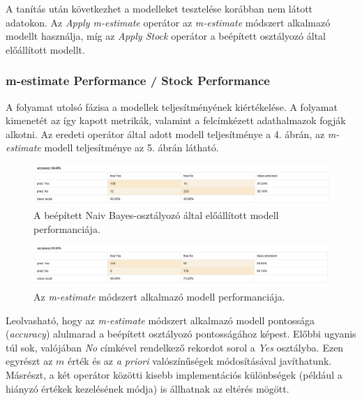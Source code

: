 \documentclass[a4paper]{article}
\begin{document}
A tanítás után következhet a modelleket tesztelése korábban nem látott adatokon. Az \textit{Apply m-estimate} operátor az \textit{m-estimate} módszert alkalmazó modellt használja, míg az \textit{Apply Stock} operátor a beépített osztályozó által előállított modellt.

\subsubsection{m-estimate Performance / Stock Performance}

A folyamat utolsó fázisa a modellek teljesítményének kiértékelése. A folyamat kimenetét az így kapott metrikák, valamint a felcímkézett adathalmazok fogják alkotni. Az eredeti operátor által adott modell teljesítménye a 4. ábrán, az \textit{m-estimate} modell teljesítménye az 5. ábrán látható.

\begin{figure}[h]
    \centering
    \includegraphics[width=15cm]{stock_performance}
    \caption{A beépített Naiv Bayes-osztályozó által előállított modell performanciája.}
\end{figure}

\begin{figure}[h]
    \centering
    \includegraphics[width=15cm]{m_estimate_performance}
    \caption{Az \textit{m-estimate} módszert alkalmazó modell performanciája.}
\end{figure}

Leolvasható, hogy az \textit{m-estimate} módszert alkalmazó modell pontossága (\textit{accuracy}) alulmarad a beépített osztályozó pontosságához képest. Előbbi ugyanis túl sok, valójában \textit{No} címkével rendelkező rekordot sorol a \textit{Yes} osztályba. Ezen egyrészt az $m$ érték és az \textit{a priori} valószínűségek módosításával javíthatunk. Másrészt, a két operátor közötti kisebb implementációs különbségek (például a hiányzó értékek kezelésének módja) is állhatnak az eltérés mögött.
\end{document}
